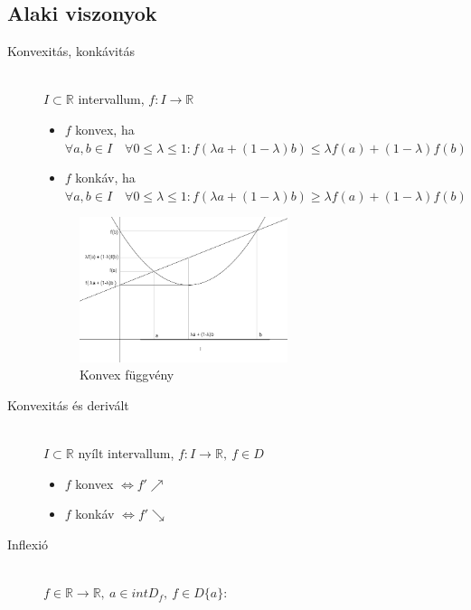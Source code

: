 \documentclass[margin=0px]{article}
\newcommand{\R}{\mathbb{R}}
\begin{document}
\subsection{Alaki viszonyok}
\begin{description}
    \item[Konvexitás, konkávitás] \hfill \\
        $ I \subset \R $ intervallum, $ f:I\rightarrow \R $
        \begin{itemize}
            \item $f$ konvex, ha \\
                  $\forall a,b \in I \quad \forall 0\leq \lambda \leq 1: f(\lambda a+(1-\lambda)b) \leq  \lambda f(a) + (1-\lambda)f(b)$
            \item $f$ konkáv, ha \\
                  $\forall a,b \in I \quad \forall 0\leq \lambda \leq 1: f(\lambda a+(1-\lambda)b) \geq  \lambda f(a) + (1-\lambda)f(b)$
        \end{itemize}
        \begin{figure}[H]
            \centering
            \includegraphics[width=0.6\textwidth]{img/konvex.png}
            \caption{Konvex függvény}
        \end{figure}
    \item[Konvexitás és derivált] \hfill \\
        $ I \subset \R $ nyílt intervallum, $f:I\rightarrow \R, \ f \in D $
        \begin{itemize}
            \item $f$ konvex $ \Leftrightarrow f' \nearrow $
            \item $f$ konkáv $ \Leftrightarrow f' \searrow $
        \end{itemize}
    \item[Inflexió] \hfill \\
        $ f \in \R \rightarrow \R, \ a \in intD_f, \ f \in D\{a\} $:
        \begin{description}

\end{description}
\end{description}
\end{document}
